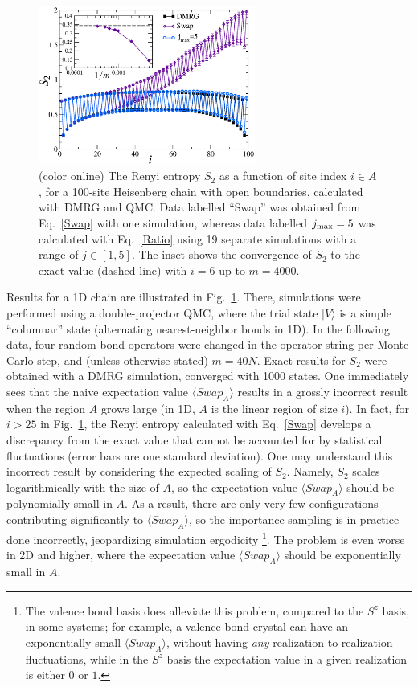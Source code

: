 \documentclass[prl,aps,twocolumn,floatfix,amsmath,amssymb,superscriptaddress,tightenlines]{revtex4}
\begin{document}
\begin{figure} {
\includegraphics[width=2.8in]{L100_fig2.eps} \caption{(color online) 
\label{1Dfig}
The Renyi entropy $S_2$ as a function of site index $i \in A$, for a 100-site Heisenberg chain with open boundaries, 
calculated with DMRG and QMC.  Data labelled ``Swap'' was obtained from Eq.~\eqref{Swap} with one simulation, whereas 
data labelled $j_{\rm max}=5$ was calculated with Eq.~\ref{Ratio} using 19 separate simulations with a range of  $j \in [1,5]$.  The inset shows the convergence of $S_2$ to the exact value (dashed line) with $i=6$ up to $m=4000$.
}
} \end{figure}

Results for a 1D chain are illustrated in Fig.~\ref{1Dfig}.  There, simulations were performed using a double-projector QMC,  where
the trial state $| V \rangle$ is a simple ``columnar'' state (alternating nearest-neighbor bonds in 1D).  In the following data, four random bond operators were changed in the operator string per Monte Carlo step, and (unless otherwise
stated) $m=40N$.  Exact results for $S_2$ were obtained with a DMRG simulation, converged with 1000 states.  One 
immediately sees that the naive expectation value $\langle Swap_A \rangle$ results in a grossly incorrect result when the region
$A$ grows large (in 1D, $A$ is the linear region of size $i$).   
In fact, for $i > 25$ in Fig.~\ref{1Dfig}, the Renyi entropy calculated with Eq.~\eqref{Swap} develops a discrepancy from the
exact value that cannot be accounted for by statistical fluctuations (error bars are one standard deviation).  
One may understand this incorrect result by considering the expected scaling of $S_2$.  Namely,
$S_2$ scales logarithmically with the size of $A$, so the expectation value
$\langle Swap_A \rangle$ should be polynomially small in $A$.  As a result, there
are only very
few configurations contributing significantly to $\langle Swap_A \rangle$, so the importance  sampling is in practice done incorrectly,
jeopardizing simulation ergodicity \footnote{The valence bond basis does alleviate this problem, compared to the
$S^z$ basis, in some systems; for example, a valence
bond crystal can have an exponentially small $\langle Swap_A \rangle$, without having {\it any} realization-to-realization fluctuations,
while in the $S^z$ basis the expectation value  in a given realization is either $0$ or $1$.}.
The problem is even worse in 2D and higher, where the expectation value 
$\langle Swap_A \rangle$ should be exponentially small in $A$.
\end{document}
